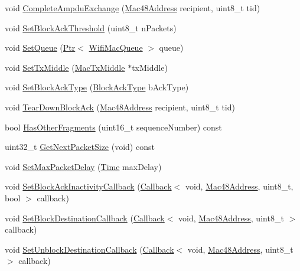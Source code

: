 \begin{DoxyCompactItemize}
\item 
void \hyperlink{classns3_1_1BlockAckManager_a3f42c74e86fa537d4f99353768ce3bb2}{Complete\+Ampdu\+Exchange} (\hyperlink{classns3_1_1Mac48Address}{Mac48\+Address} recipient, uint8\+\_\+t tid)
\item 
void \hyperlink{classns3_1_1BlockAckManager_a3d6ba0be51a232044d8373ada7f4d0e2}{Set\+Block\+Ack\+Threshold} (uint8\+\_\+t n\+Packets)
\item 
void \hyperlink{classns3_1_1BlockAckManager_a220aecfc19f84b497b1ee8781641e2a1}{Set\+Queue} (\hyperlink{classns3_1_1Ptr}{Ptr}$<$ \hyperlink{namespacens3_a3ca96bcdf02c0e7cacea08ca62ead54c}{Wifi\+Mac\+Queue} $>$ queue)
\item 
void \hyperlink{classns3_1_1BlockAckManager_a76ee2237b1d65a04f96806fa25d30d24}{Set\+Tx\+Middle} (\hyperlink{classns3_1_1MacTxMiddle}{Mac\+Tx\+Middle} $\ast$tx\+Middle)
\item 
void \hyperlink{classns3_1_1BlockAckManager_ab281f28839a128021bf1a7369d75d502}{Set\+Block\+Ack\+Type} (\hyperlink{namespacens3_a90f436472d19d7d7f37cbf0b8c288ff7}{Block\+Ack\+Type} b\+Ack\+Type)
\item 
void \hyperlink{classns3_1_1BlockAckManager_ac18cb8344ca8061c116df54064aee5e4}{Tear\+Down\+Block\+Ack} (\hyperlink{classns3_1_1Mac48Address}{Mac48\+Address} recipient, uint8\+\_\+t tid)
\item 
bool \hyperlink{classns3_1_1BlockAckManager_a2928efefb708e3ad0379ab11944b9e24}{Has\+Other\+Fragments} (uint16\+\_\+t sequence\+Number) const 
\item 
uint32\+\_\+t \hyperlink{classns3_1_1BlockAckManager_a38418623e12f21f2b416bfcd700b2abe}{Get\+Next\+Packet\+Size} (void) const 
\item 
void \hyperlink{classns3_1_1BlockAckManager_abf175ea3603c1ef5cd1edd21a5911da2}{Set\+Max\+Packet\+Delay} (\hyperlink{classns3_1_1Time}{Time} max\+Delay)
\item 
void \hyperlink{classns3_1_1BlockAckManager_aba54a7f80dad49b371ebdc5ffe11d651}{Set\+Block\+Ack\+Inactivity\+Callback} (\hyperlink{classns3_1_1Callback}{Callback}$<$ void, \hyperlink{classns3_1_1Mac48Address}{Mac48\+Address}, uint8\+\_\+t, bool $>$ callback)
\item 
void \hyperlink{classns3_1_1BlockAckManager_a9ff02e52af689aa218f43e871a43503d}{Set\+Block\+Destination\+Callback} (\hyperlink{classns3_1_1Callback}{Callback}$<$ void, \hyperlink{classns3_1_1Mac48Address}{Mac48\+Address}, uint8\+\_\+t $>$ callback)
\item 
void \hyperlink{classns3_1_1BlockAckManager_a591b2a7853ffdd524a1e952cd44820eb}{Set\+Unblock\+Destination\+Callback} (\hyperlink{classns3_1_1Callback}{Callback}$<$ void, \hyperlink{classns3_1_1Mac48Address}{Mac48\+Address}, uint8\+\_\+t $>$ callback)

\end{DoxyCompactItemize}
